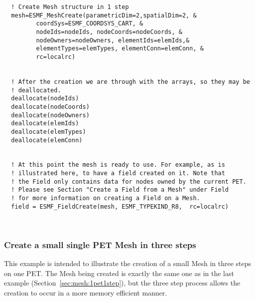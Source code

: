 \begin{verbatim}
  ! Create Mesh structure in 1 step
  mesh=ESMF_MeshCreate(parametricDim=2,spatialDim=2, &
         coordSys=ESMF_COORDSYS_CART, &
         nodeIds=nodeIds, nodeCoords=nodeCoords, &
         nodeOwners=nodeOwners, elementIds=elemIds,&
         elementTypes=elemTypes, elementConn=elemConn, &
         rc=localrc)


  ! After the creation we are through with the arrays, so they may be
  ! deallocated.
  deallocate(nodeIds)
  deallocate(nodeCoords)
  deallocate(nodeOwners)
  deallocate(elemIds)
  deallocate(elemTypes)
  deallocate(elemConn)


  ! At this point the mesh is ready to use. For example, as is 
  ! illustrated here, to have a field created on it. Note that 
  ! the Field only contains data for nodes owned by the current PET.
  ! Please see Section "Create a Field from a Mesh" under Field
  ! for more information on creating a Field on a Mesh. 
  field = ESMF_FieldCreate(mesh, ESMF_TYPEKIND_R8,  rc=localrc)

 
\end{verbatim}
 

  \subsubsection{Create a small single PET Mesh in three steps}\label{sec:mesh:1pet3step}
  
   This example is intended to illustrate the creation of a small Mesh in three steps on one PET. The Mesh being created is exactly
   the same one as in the last example (Section~\ref{sec:mesh:1pet1step}), but the three step process allows the creation to occur in 
   a more memory efficient manner. 
    

